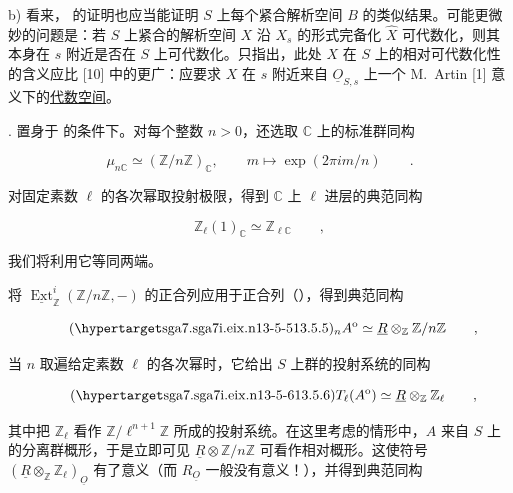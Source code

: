 \smallskip
\noindent
b) 看来， 的证明也应当能证明 $S$ 上每个紧合解析空间 $B$ 的类似结果。可能更微妙的问题是：若 $S$ 上紧合的解析空间 $X$ 沿 $X_s$ 的形式完备化 $\hat X$ 可代数化，则其本身在 $s$ 附近是否在 $S$ 上可代数化。只指出，此处 $X$ 在 $S$ 上的相对可代数化性的含义应比 [10] 中的更广：应要求 $X$ 在 $s$ 附近来自 $\underline O_{S,s}$ 上一个 M.~Artin [1] 意义下的\underline{代数空间}。

\medskip
\noindent
{}. 置身于  的条件下。对每个整数 $n>0$，还选取 $\mathbb C$ 上的标准群同构

\begin{equation*}
 \mu_{n\mathbb C}\simeq(\mathbb Z/n\mathbb Z)_{\mathbb C},
 \qquad m\longmapsto\exp(2\pi i m/n)\qquad .
\end{equation*}

\noindent
对固定素数 $\ell$ 的各次幂取投射极限，得到 $\mathbb C$ 上 $\ell$ 进层的典范同构

\begin{equation*}
 \mathbb Z_\ell(1)_{\mathbb C}\simeq\mathbb Z_{\ell\mathbb C}
 \qquad ,
\end{equation*}

\noindent
我们将利用它等同两端。

将 $\underline{\operatorname{Ext}}^i_{\mathbb Z}(\mathbb Z/n\mathbb Z,-)$ 的正合列应用于正合列（），得到典范同构

\begin{equation}\tag{\SGARefTarget{sga7.sga7i.eix.n13-5-5}{13.5.5}}
 {}_nA^{\mathrm o}\simeq
 \underline R\otimes_{\mathbb Z}\mathbb Z/n\mathbb Z
 \qquad ,
\end{equation}

\noindent
当 $n$ 取遍给定素数 $\ell$ 的各次幂时，它给出 $S$ 上群的投射系统的同构

\begin{equation}\tag{\SGARefTarget{sga7.sga7i.eix.n13-5-6}{13.5.6}}
 T_\ell(A^{\mathrm o})\simeq
 \underline R\otimes_{\mathbb Z}\mathbb Z_\ell
 \qquad ,
\end{equation}

\noindent
其中把 $\mathbb Z_\ell$ 看作 $\mathbb Z/\ell^{n+1}\mathbb Z$ 所成的投射系统。在这里考虑的情形中，$A$ 来自 $S$ 上的分离群概形，于是立即可见 $\underline R\otimes\mathbb Z/n\mathbb Z$ 可看作相对概形。这使符号 $(\underline R\otimes_{\mathbb Z}\mathbb Z_\ell)_{\underline O}$ 有了意义（而 $R_{\underline O}$ 一般没有意义！），并得到典范同构

